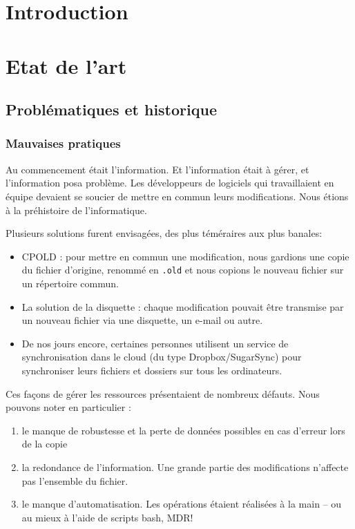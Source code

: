 
\section*{Introduction}

\section{Etat de l'art}

\subsection{Problématiques et historique}


\subsubsection{Mauvaises pratiques}

Au commencement était l'information. Et l'information était à gérer, et l'information posa problème. Les développeurs de logiciels qui travaillaient en équipe devaient se soucier de mettre en commun leurs modifications. 
Nous étions à la préhistoire de l'informatique.

Plusieurs solutions furent envisagées, des plus téméraires aux plus banales:
\begin{itemize}
\item CPOLD : pour mettre en commun une modification, nous gardions une copie du fichier d'origine, renommé en \texttt{.old} et nous copions le nouveau fichier sur un répertoire commun. 
\item La solution de la disquette : chaque modification pouvait être transmise par un nouveau fichier via une disquette, un e-mail ou autre.
\item De nos jours encore, certaines personnes utilisent un service de synchronisation dans le cloud (du type Dropbox/SugarSync) pour synchroniser leurs fichiers et dossiers sur tous les ordinateurs. 
\end{itemize}

Ces façons de gérer les ressources présentaient de nombreux défauts. Nous pouvons noter en particulier : 
\begin{enumerate}
\item le manque de robustesse et la perte de données possibles en cas d'erreur lors de la copie
\item la redondance de l'information. Une grande partie des modifications n'affecte pas l'ensemble du fichier. 
\item le manque d'automatisation. Les opérations étaient réalisées à la main -- ou au mieux à l'aide de scripts bash, MDR! 
\end{enumerate}

